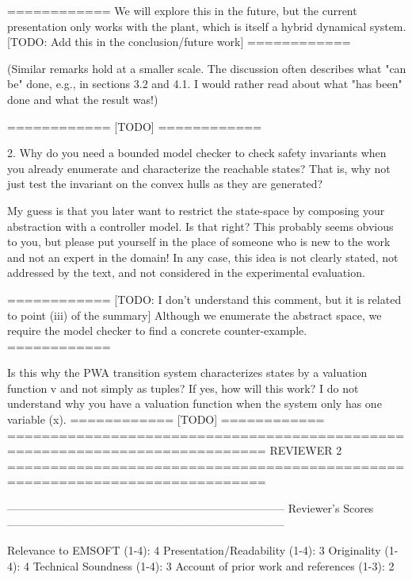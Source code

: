    ============
   We will explore this in the future, but the current presentation
   only works with the plant, which is itself a hybrid dynamical
   system.
   [TODO: Add this in the conclusion/future work]
   ============


   (Similar remarks hold at a smaller scale. The discussion often describes
    what "can be" done, e.g., in sections 3.2 and 4.1. I would rather read
    about what "has been" done and what the result was!)

   ============
   [TODO]
   ============

2. Why do you need a bounded model checker to check safety invariants when
   you already enumerate and characterize the reachable states? That is, why
   not just test the invariant on the convex hulls as they are generated?

   My guess is that you later want to restrict the state-space by composing
   your abstraction with a controller model. Is that right? This probably
   seems obvious to you, but please put yourself in the place of someone who
   is new to the work and not an expert in the domain! In any case, this
   idea is not clearly stated, not addressed by the text, and not considered
   in the experimental evaluation.

   ============
   [TODO: I don't understand this comment, but it is related to
   point (iii) of the summary]
   Although we enumerate the abstract space, we require the model
   checker to find a concrete counter-example.
   ============

   Is this why the PWA transition system characterizes states by a valuation
   function v and not simply as tuples? If yes, how will this work? I do not
   understand why you have a valuation function when the system only has one
   variable (x).
   ============
   [TODO]
   ============
============================================================================
                            REVIEWER 2
============================================================================


---------------------------------------------------------------------------
Reviewer's Scores
---------------------------------------------------------------------------

               Relevance to EMSOFT (1-4): 4
          Presentation/Readability (1-4): 3
                       Originality (1-4): 4
               Technical Soundness (1-4): 3
Account of prior work and references (1-3): 2


